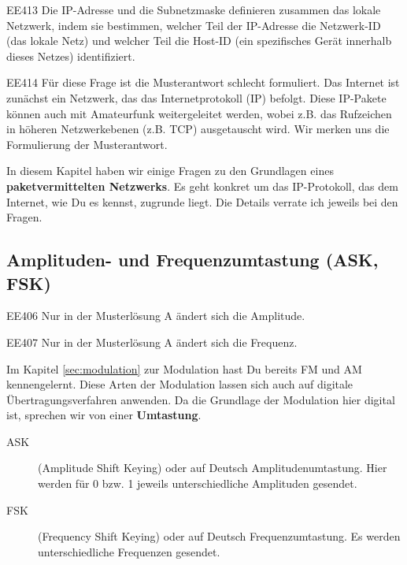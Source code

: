 \begin{sol}{EE413}
Die IP-Adresse und die Subnetzmaske definieren zusammen das lokale Netzwerk, indem sie bestimmen, welcher Teil der IP-Adresse die Netzwerk-ID (das lokale Netz) und welcher Teil die Host-ID (ein spezifisches Gerät innerhalb dieses Netzes) identifiziert.
\end{sol}

\begin{sol}{EE414}
  Für diese Frage ist die Musterantwort schlecht formuliert. Das Internet ist zunächst ein Netzwerk, das das Internetprotokoll (IP) befolgt. Diese IP-Pakete können auch mit Amateurfunk weitergeleitet werden, wobei z.B. das Rufzeichen in höheren Netzwerkebenen (z.B. TCP) ausgetauscht wird. Wir merken uns die Formulierung der Musterantwort.
\end{sol}


\begin{ohmchapter}
In diesem Kapitel haben wir einige Fragen zu den Grundlagen eines \textbf{paketvermittelten Netzwerks}. Es geht konkret um das IP-Protokoll, das dem Internet, wie Du es kennst, zugrunde liegt. Die Details verrate ich jeweils bei den Fragen.

\end{ohmchapter}


\subsection{Amplituden- und Frequenzumtastung (ASK, FSK)}

\begin{sol}{EE406}
Nur in der Musterlösung A ändert sich die Amplitude.
\end{sol}


\begin{sol}{EE407}
Nur in der Musterlösung A ändert sich die Frequenz.
\end{sol}

\begin{ohmchapter}
  Im Kapitel \ref{sec:modulation} zur Modulation hast Du bereits FM und AM kennengelernt. 
  Diese Arten der Modulation lassen sich auch auf digitale Übertragungsverfahren anwenden.
  Da die Grundlage der Modulation hier digital ist, sprechen wir von einer \textbf{Umtastung}.

  \begin{description}
    \item[ASK] (Amplitude Shift Keying) oder auf Deutsch Amplitudenumtastung.
    Hier werden für 0 bzw. 1 jeweils unterschiedliche Amplituden gesendet.
    \item[FSK] (Frequency Shift Keying) oder auf Deutsch Frequenzumtastung. Es werden unterschiedliche Frequenzen gesendet.
  \end{description}

\end{ohmchapter}

